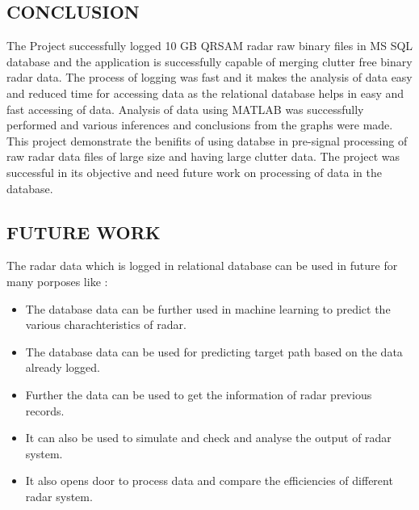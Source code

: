 \documentclass[14pt]{article} %
\begin{document}
\subsection{CONCLUSION}
The Project successfully logged 10 GB QRSAM radar raw binary files in MS SQL database and the application is successfully capable of merging clutter free binary radar data.
The process of logging was fast and it makes the analysis of data easy and reduced time for accessing data as the  relational database helps in easy and fast accessing of data.
 Analysis of data using MATLAB was successfully performed and various inferences and conclusions from the graphs were made. This project demonstrate the benifits of using 
 databse in pre-signal processing of raw radar data files of large size and having large clutter data. The project was successful in its objective and need future work on processing of data in the database.
 \subsection{FUTURE WORK}
 The radar data which is logged in relational database can be used in future for many porposes like :
 \begin{itemize}
 \item  The database data can be further used in machine learning to predict the various charachteristics of radar.
 \item The database data can be used for predicting target path based on the data already logged.
 \item Further the data can be used to get the information of radar previous records.
 \item It can also be used to simulate and check and analyse the output of radar system.
 \item It also opens door to process data and compare the efficiencies of different radar system.
 \end{itemize}
\end{document}
